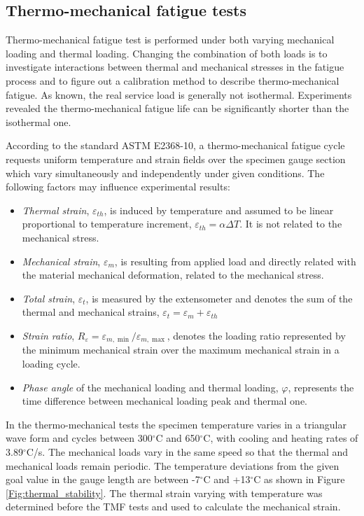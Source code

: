 \documentclass[preprint,5p,twocolumn,11pt,sort&compress]{elsarticle}
\begin{document}
\subsection{Thermo-mechanical fatigue tests}
\noindent
Thermo-mechanical fatigue test is performed under both varying mechanical loading and thermal loading.
Changing the combination of both loads is to investigate interactions between thermal and mechanical stresses in the fatigue process and to figure out a calibration method to describe thermo-mechanical fatigue. As known, the real service load is generally not isothermal. Experiments revealed the thermo-mechanical fatigue life can be significantly shorter than the isothermal one.

According to the standard ASTM E2368-10, a thermo-mechanical fatigue cycle requests uniform temperature and strain fields over the specimen gauge section which vary simultaneously and independently under given conditions. The following factors may influence experimental results:
\begin{itemize}
  \item {\em Thermal strain}, $\varepsilon_{th}$, is induced by temperature and assumed to be linear proportional to temperature increment, $\varepsilon_{th}=\alpha \Delta T$.  It is not related to the mechanical stress.
  \item {\em Mechanical strain}, $\varepsilon_{m}$, is resulting from applied load and directly related with the material mechanical deformation, related to the mechanical stress.
  \item {\em Total strain}, $\varepsilon_t$, is measured by the extensometer and denotes the sum of the thermal and mechanical strains, $\varepsilon_t=\varepsilon_m+\varepsilon_{th}$
  \item {\em Strain ratio}, $ R_{\varepsilon}=\varepsilon_{m,\min}/\varepsilon_{m,\max}$, denotes the loading ratio represented by the minimum mechanical strain over the maximum mechanical strain in a loading cycle.
  \item {\em Phase angle} of the mechanical loading and thermal loading, $\varphi$, represents the time difference between mechanical loading peak and thermal one.
\end{itemize}


In the thermo-mechanical tests the specimen temperature varies in a triangular wave form and cycles between 300$^{\circ}$C and 650$^{\circ}$C, with cooling and heating rates of 3.89$^{\circ}$C/s. The mechanical loads vary in the same speed so that the thermal and mechanical loads remain periodic.
The temperature deviations from the given goal value in the gauge length are between -7$^{\circ}$C and +13$^{\circ}$C as shown in Figure \ref{Fig:thermal_stability}.
The thermal strain varying with temperature was determined before the TMF tests and used to calculate the mechanical strain.
\end{document}
